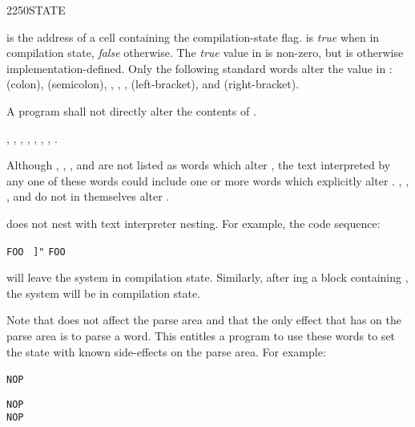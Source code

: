 \begin{worddef}{2250}{STATE}
\item {}

	 is the address of a cell containing the
	compilation-state flag.  is \emph{true} when in
	compilation state, \emph{false} otherwise. The \emph{true} value
	in  is non-zero, but is otherwise
	implementation-defined. Only the following standard words alter
	the value in :
	\word{:} (colon),
	\word{;} (semicolon),
	,
	,
	,
	\word{[} (left-bracket), and
	\word{]} (right-bracket).

\note
	A program shall not directly alter the contents of .

\see {},
	,
	,
	,
	\wref{core:[}{[},
	\wref{core:]}{]},
	,
	.

	\begin{defer}
	\rationale %
		Although
		,
		,
		, and
		are not listed as words which alter , the text
		interpreted by any one of these words could include one or
		more words which explicitly alter .
		,
		,
		, and
		do not in themselves alter .

		 does not nest with text interpreter nesting. For
		example, the code sequence:

		\tab \word{:} \texttt{FOO}~
			 \texttt{]"} 
		\word{;}
		\qquad
		\texttt{FOO}

		will leave the system in compilation state. Similarly, after
		ing a block containing \word{]}, the system
		will be in compilation state.

		Note that \word{]} does not affect the parse area and that the
		only effect that \word{:} has on the parse area is to parse a
		word. This entitles a program to use these words to set the
		state with known side-effects on the parse area. For example:

		\tab \word{:} \texttt{NOP}~
			\word{:}  \word{;} 
		\word{;}

		\tab \texttt{NOP}  \\
		\tab \texttt{NOP} 


\end{defer}
\end{worddef}
